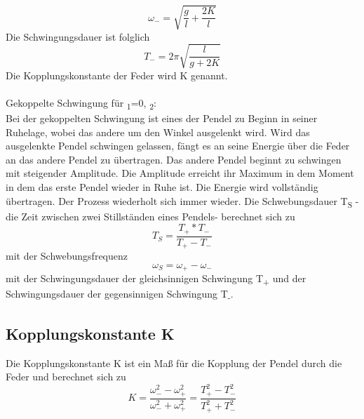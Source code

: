 \documentclass[titlepage=firstcover, captions=tableheading]{scrartcl}
\begin{document}
\begin{displaymath}
    \omega_-=\sqrt{\frac{g}{l}+\frac{2K}{l}}
\end{displaymath}
Die Schwingungsdauer ist folglich
\begin{displaymath}
    T_-=2\pi\sqrt{\frac{l}{g+2K}}
\end{displaymath}
Die Kopplungskonstante der Feder wird K genannt.
\\\\
Gekoppelte Schwingung für \alpha\textsubscript{1}=0, \alpha\textsubscript{2}:\\
Bei der gekoppelten Schwingung ist eines der Pendel zu Beginn in seiner Ruhelage, wobei das andere um den Winkel \alpha  ausgelenkt wird. Wird das ausgelenkte Pendel schwingen gelassen, fängt es an seine Energie über die Feder an das andere Pendel zu übertragen. Das andere Pendel beginnt zu schwingen mit steigender Amplitude. Die Amplitude erreicht ihr Maximum in dem Moment in dem das erste Pendel wieder in Ruhe ist. Die Energie wird vollständig übertragen. Der Prozess wiederholt sich immer wieder. Die Schwebungsdauer T\textsubscript{S} -die Zeit zwischen zwei Stillständen eines Pendels- berechnet sich zu 
\begin{displaymath}
    T_S=\frac{T_+*T_-}{T_+-T_-}
\end{displaymath}
mit der Schwebungsfrequenz
\begin{displaymath}
    \omega_S=\omega_+-\omega_-
\end{displaymath}
mit der Schwingungsdauer der gleichsinnigen Schwingung T\textsubscript{+} und der Schwingungsdauer der gegensinnigen Schwingung T\textsubscript{-}. \\
\subsection{Kopplungskonstante K}
\noindent Die Kopplungskonstante K ist ein Maß für die Kopplung der Pendel durch die Feder und berechnet sich zu 
\begin{displaymath}
    K=\frac{\omega_-^2-\omega_+^2}{\omega_-^2+\omega_+^2}=\frac{T_+^2-T_-^2}{T_+^2+T_-^2}
\end{displaymath}
\end{document}
